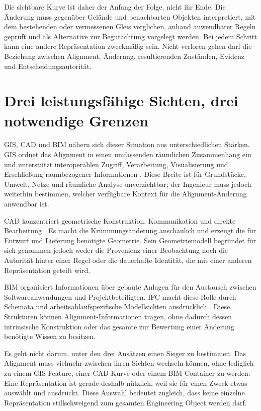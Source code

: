 Die sichtbare Kurve ist daher der Anfang der Folge, nicht ihr Ende. Die
Änderung muss gegenüber Gelände und benachbarten Objekten interpretiert, mit
dem bestehenden oder vermessenen Gleis verglichen, anhand anwendbarer Regeln
geprüft und als Alternative zur Begutachtung vorgelegt werden. Bei jedem
Schritt kann eine andere Repräsentation zweckmäßig sein. Nicht verloren gehen
darf die Beziehung zwischen Alignment, Änderung, resultierenden Zuständen,
Evidenz und Entscheidungsautorität.

\section{Drei leistungsfähige Sichten, drei notwendige Grenzen}

GIS, CAD und BIM nähern sich dieser Situation aus unterschiedlichen Stärken.
GIS ordnet das Alignment in einen umfassenden räumlichen Zusammenhang ein und
unterstützt interoperablen Zugriff, Verarbeitung, Visualisierung und
Erschließung raumbezogener Informationen \cite{OGCStandardsProgram2025}. Diese
Breite ist für Grundstücke, Umwelt, Netze und räumliche Analyse unverzichtbar;
der Ingenieur muss jedoch weiterhin bestimmen, welcher verfügbare Kontext für
die Alignment-Änderung anwendbar ist.

CAD konzentriert geometrische Konstruktion, Kommunikation und direkte
Bearbeitung \cite{KimKumarSnider2015Geometry}. Es macht die
Krümmungsänderung anschaulich und erzeugt die für Entwurf und Lieferung
benötigte Geometrie. Sein Geometriemodell begründet für sich genommen jedoch
weder die Provenienz einer Beobachtung noch die Autorität hinter einer Regel
oder die dauerhafte Identität, die mit einer anderen Repräsentation geteilt
wird.

BIM organisiert Informationen über gebaute Anlagen für den Austausch zwischen
Softwareanwendungen und Projektbeteiligten. IFC macht diese Rolle durch
Schemata und arbeitsablaufspezifische Modellsichten ausdrücklich
\cite{BuildingSMARTIFC4x3Scope}. Diese Strukturen können
Alignment-Informationen tragen, ohne dadurch dessen intrinsische Konstruktion
oder das gesamte zur Bewertung einer Änderung benötigte Wissen zu besitzen.

Es geht nicht darum, unter den drei Ansätzen einen Sieger zu bestimmen. Das
Alignment muss vielmehr zwischen ihren Sichten wechseln können, ohne lediglich
zu einem GIS-Feature, einer CAD-Kurve oder einem BIM-Container zu werden. Eine
Repräsentation ist gerade deshalb nützlich, weil sie für einen Zweck etwas
auswählt und ausdrückt. Diese Auswahl bedeutet zugleich, dass keine einzelne
Repräsentation stillschweigend zum gesamten Engineering Object werden darf.

